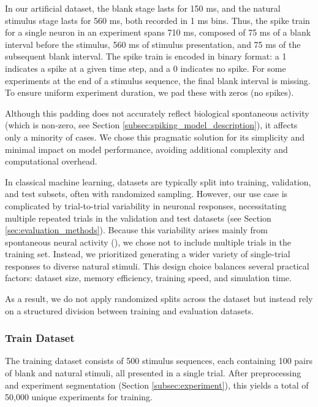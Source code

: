 In our artificial dataset, the blank stage lasts for 150 ms, and the natural stimulus stage lasts for 560 ms, both recorded in 1 ms bins. Thus, the spike train for a single neuron in an experiment spans 710 ms, composed of 75 ms of a blank interval before the stimulus, 560 ms of stimulus presentation, and 75 ms of the subsequent blank interval. The spike train is encoded in binary format: a 1 indicates a spike at a given time step, and a 0 indicates no spike. For some experiments at the end of a stimulus sequence, the final blank interval is missing. To ensure uniform experiment duration, we pad these with zeros (no spikes).

Although this padding does not accurately reflect biological spontaneous activity (which is non-zero, see Section \ref{subsec:spiking_model_description}), it affects only a minority of cases. We chose this pragmatic solution for its simplicity and minimal impact on model performance, avoiding additional complexity and computational overhead.

In classical machine learning, datasets are typically split into training, validation, and test subsets, often with randomized sampling. However, our use case is complicated by trial-to-trial variability in neuronal responses, necessitating multiple repeated trials in the validation and test datasets (see Section \ref{sec:evaluation_methods}). Because this variability arises mainly from spontaneous neural activity (\citet{antolik2024comprehensive}), we chose not to include multiple trials in the training set. Instead, we prioritized generating a wider variety of single-trial responses to diverse natural stimuli. This design choice balances several practical factors: dataset size, memory efficiency, training speed, and simulation time.

As a result, we do not apply randomized splits across the dataset but instead rely on a structured division between training and evaluation datasets.

\subsubsection{Train Dataset}
\label{subsubsec:train_dataset}

The training dataset consists of 500 stimulus sequences, each containing 100 pairs of blank and natural stimuli, all presented in a single trial. After preprocessing and experiment segmentation (Section \ref{subsec:experiment}), this yields a total of 50,000 unique experiments for training.

